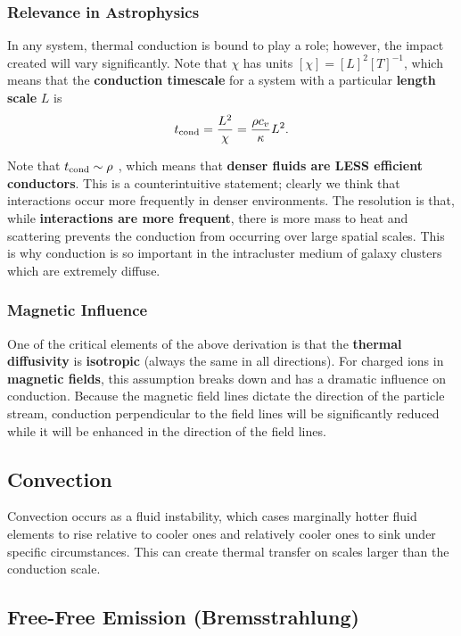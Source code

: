 \subsubsection{Relevance in Astrophysics}

In any system, thermal conduction is bound to play a role; however, the impact created will vary significantly. Note that $\chi$ has units $\left[\chi\right] = \left[L\right]^2 \left[T\right]^{-1}$, which means that the \textbf{conduction timescale} for a system with a particular \textbf{length scale} $L$ is
\[
t_{\rm cond} = \frac{L^2}{\chi} = \frac{\rho c_v}{\kappa} L^2.
\]
\begin{remark}
    Note that $t_{\rm cond} \sim \rho$ , which means that \textbf{denser fluids are LESS efficient conductors}. This is a counterintuitive statement; clearly we think that interactions occur more frequently in denser environments. The resolution is that, while \textbf{interactions are more frequent}, there is more mass to heat and scattering prevents the conduction from occurring over large spatial scales. This is why conduction is so important in the intracluster medium of galaxy clusters which are extremely diffuse.
\end{remark}

\subsubsection{Magnetic Influence}
One of the critical elements of the above derivation is that the \textbf{thermal diffusivity} is \textbf{isotropic} (always the same in all directions). For charged ions in \textbf{magnetic fields}, this assumption breaks down and has a dramatic influence on conduction. Because the magnetic field lines dictate the direction of the particle stream, conduction perpendicular to the field lines will be significantly reduced while it will be enhanced in the direction of the field lines.

\subsection{Convection}
Convection occurs as a fluid instability, which cases marginally hotter fluid elements to rise relative to cooler ones and relatively cooler ones to sink under specific circumstances. This can create thermal transfer on scales larger than the conduction scale.

\subsection{Free-Free Emission (Bremsstrahlung)}

